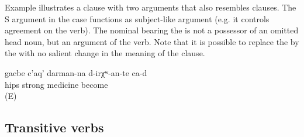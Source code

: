 Example  illustrates a clause with two arguments that also resembles  clauses. The S argument in the  case functions as subject-like argument (e.g. it controls agreement on the verb). The nominal bearing the  is not a possessor of an omitted head noun, but an argument of the verb. Note that it is possible to replace the  by the  with no salient change in the meaning of the clause.
%
\begin{exe}
	\ex	\label{ex:The hips will be a strong medicine}
	\gll	gacbe	c'aq'	darman-na	d-irχʷ-an-te	ca-d\\
		hips	strong	medicine	become	\\
	\glt	{} (E)
\end{exe}



\subsection{Transitive verbs}
\label{sec:Transitive verbs}

